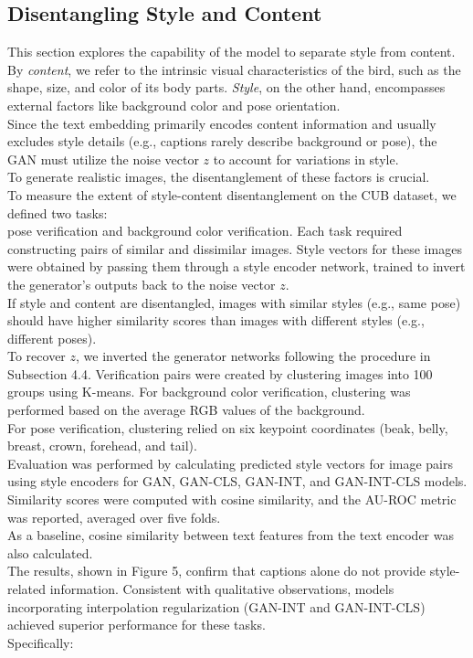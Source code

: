 \subsection*{Disentangling Style and Content}

This section explores the capability of the model 
to separate style from content. 
\\
By \textit{content}, we refer to the intrinsic visual 
characteristics of the bird, such as the shape, size, 
and color of its body parts. 
\textit{Style}, on the other hand, encompasses external 
factors like background color and pose orientation.
\\
Since the text embedding primarily encodes content 
information and usually excludes style details 
(e.g., captions rarely describe background or pose), 
the GAN must utilize the noise vector \(z\) 
to account for variations in style. 
\\
To generate realistic images, the disentanglement 
of these factors is crucial.
\\
To measure the extent of style-content disentanglement 
on the CUB dataset, we defined two tasks: 
\\
pose verification and background color verification. 
Each task required constructing pairs of similar and 
dissimilar images. 
Style vectors for these images were obtained by passing 
them through a style encoder network, 
trained to invert the generator's outputs back to the 
noise vector \(z\). 
\\
If style and content are disentangled, images with similar 
styles (e.g., same pose) should have higher similarity 
scores than images with different styles 
(e.g., different poses).
\\
To recover \(z\), we inverted the generator networks 
following the procedure in Subsection 4.4. Verification 
pairs were created by clustering images into 100 groups 
using K-means. For background color verification, 
clustering was performed based on the average RGB values 
of the background. 
\\
For pose verification, clustering relied on six keypoint 
coordinates (beak, belly, breast, crown, forehead, and tail).
\\
Evaluation was performed by calculating predicted style 
vectors for image pairs using style encoders for GAN, 
GAN-CLS, GAN-INT, and GAN-INT-CLS models. 
\\
Similarity scores were computed with cosine similarity, 
and the AU-ROC metric was reported, averaged over five 
folds. 
\\
As a baseline, cosine similarity between text features 
from the text encoder was also calculated.
\\
The results, shown in Figure 5, confirm that 
captions alone do not provide style-related information. 
Consistent with qualitative observations, models 
incorporating interpolation regularization 
(GAN-INT and GAN-INT-CLS) achieved superior performance 
for these tasks. \\
Specifically:

